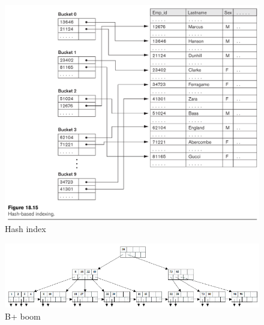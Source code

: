 \documentclass[indexstructuren.tex]{subfiles}
\begin{document}
\begin{figure}[H]
\includegraphics[width=\linewidth]{illustraties/hash_index.png}
\caption{Hash index}
\end{figure}
\begin{figure}[H]
\includegraphics[width=\linewidth]{illustraties/b_plus_tree.png}
\caption{B+ boom}
\end{figure}
\end{document}
